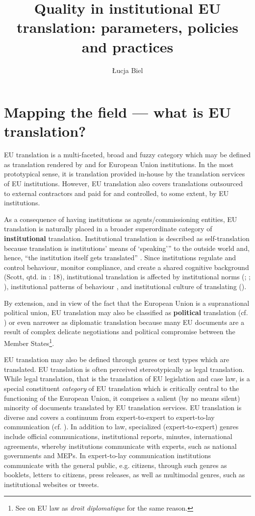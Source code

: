 \documentclass[output=paper]{langsci/langscibook}
\author{Łucja Biel\affiliation{University of Warsaw}}
\title{Quality in institutional EU translation: parameters, policies and practices}
\begin{document}
 


\section{Mapping the field — what is EU translation?}\label{sec:biel:1}

EU translation is a multi-faceted, broad and fuzzy category which may be defined as translation rendered by and for European Union institutions. In the most prototypical sense, it is translation provided in-house by the translation services of EU institutions. However, EU translation also covers translations outsourced to external contractors and paid for and controlled, to some extent, by EU institutions.

As a consequence of having institutions as agents/commissioning entities, EU translation is naturally placed in a broader superordinate category of \textbf{institutional} translation. Institutional translation is described as self-translation because translation is institutions’ means of ‘speaking’” to the outside world and, hence, “the institution itself gets translated” \citep[22]{Koskinen2008}. Since institutions regulate and control behaviour, monitor compliance, and create a shared cognitive background (Scott, qtd. in \citealt{Koskinen2008}: 18), institutional translation is affected by institutional norms (\citealt[50]{Koskinen2000}; \citealt[65]{WagnerEtAl2002}; \citealt[101]{Felici2010}), institutional patterns of behaviour \citep[144]{Kang2011}, and institutional culture of translating (\citealt[470]{Mason2004[2003]}). 

By extension, and in view of the fact that the European Union is a supranational political union, EU translation may also be classified as \textbf{political} translation (cf. \citealt[147]{Trosborg1997}) or even narrower as diplomatic translation because many EU documents are a result of complex delicate negotiations and political compromise between the Member States\footnote{See \citet[44]{Šarčević2007} on EU law as \textit{droit diplomatique} for the same reason.}.

EU translation may also be defined through genres or text types which are translated. EU translation is often perceived stereotypically as legal translation. While legal translation, that is the translation of EU legislation and case law, is a special constituent \textit{category} of EU translation which is critically central to the functioning of the European Union, it comprises a salient (by no means silent) minority of documents translated by EU translation services. EU translation is diverse and covers a continuum from expert-to-expert to expert-to-lay communication (cf. \citealt[56]{Biel2014}). In addition to law, specialized (expert-to-expert) genres include official communications, institutional reports, minutes, international agreements, whereby institutions communicate with experts, such as national governments and MEPs. In expert-to-lay communication institutions communicate with the general public, e.g. citizens, through such genres as booklets, letters to citizens, press releases, as well as multimodal genres, such as institutional websites or tweets. 
\end{document}
